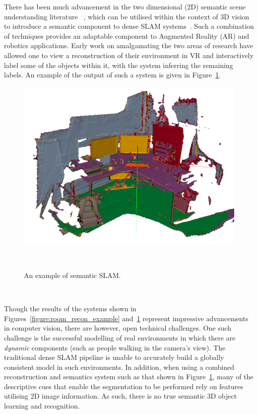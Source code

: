 There has been much advancement in the two dimensional (2D) semantic scene understanding literature
~\cite{Girshick2014,Shelhamer2017,Civera2011}, which can be utilised within the context of 3D vision to introduce a 
semantic component to dense SLAM systems~\cite{Valentin2015,Golodetz2015,Cavallari2016}. Such a combination of techniques 
provides an adaptable component to Augmented Reality (AR) and robotics applications. Early work on amalgamating the two areas 
of research have allowed one to view a reconstruction of their environment in VR and interactively label some of the objects within it, with 
the system inferring the remaining labels. An example of the output of such a system is given in Figure~\ref{figure:spaint_teaser}.
\begin{figure}[!htbp]
  \centering
  \includegraphics[width=.8\linewidth]{figures/intro/spaint-teaser.png}
  \caption[Room Scale Dense Reconstruction]{An example of semantic SLAM.\footnotemark}
~\label{figure:spaint_teaser}
\end{figure}

~

Though the results of the systems shown in Figures~\ref{figure:room_recon_example} and~\ref{figure:spaint_teaser} 
represent impressive advancements in computer vision, there are however, open technical challenges. One such 
challenge is the successful modelling of real environments in which there are \textit{dynamic} components (such as 
people walking in the camera's view). The traditional dense SLAM pipeline is unable to accurately build a 
globally consistent model in such environments. In addition, when using a combined reconstruction and 
semantics system such as that shown in Figure~\ref{figure:spaint_teaser}, many of the descriptive cues that 
enable the segmentation to be performed rely on features utilising 2D image information. As such, there is 
no true semantic 3D object learning and recognition.

